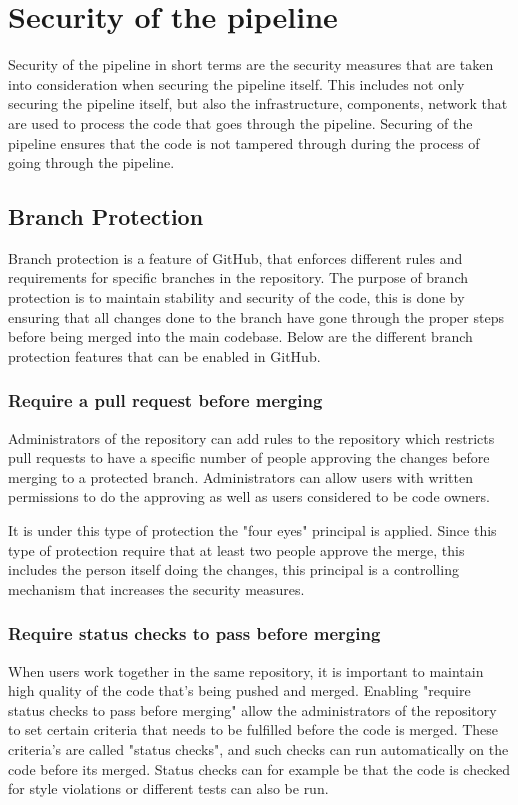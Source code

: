 \section{Security of the pipeline}
Security of the pipeline in short terms are the security measures that are taken into consideration when securing the pipeline itself. This includes not only securing the pipeline itself, but also the infrastructure, components, network that are used to process the code that goes through the pipeline. Securing of the pipeline ensures that the code is not tampered through during the process of going through the pipeline. 


\subsection{Branch Protection}
\label{branchprotection}
Branch protection is a feature of GitHub, that enforces different rules and requirements for specific branches in the repository. The purpose of branch protection is to maintain stability and security of the code, this is done by ensuring that all changes done to the branch have gone through the proper steps before being merged into the main codebase. Below are the different branch protection features that can be enabled in GitHub. \cite{ProtectedBranches}
\\
\subsubsection{Require a pull request before merging}
Administrators of the repository can add rules to the repository which restricts pull requests to have a specific number of people approving the changes before merging to a protected branch. Administrators can allow users with written permissions to do the approving as well as users considered to be code owners. 

It is under this type of protection the "four eyes" principal is applied. Since this type of protection require that at least two people approve the merge, this includes the person itself doing the changes, this principal is a controlling mechanism that increases the security measures. 
\\
\subsubsection{Require status checks to pass before merging}
When users work together in the same repository, it is important to maintain high quality of the code that's being pushed and merged. Enabling "require status checks to pass before merging" allow the administrators of the repository to set certain criteria that needs to be fulfilled before the code is merged. These criteria's are called "status checks", and such checks can run automatically on the code before its merged. Status checks can for example be that the code is checked for style violations or different tests can also be run. 
\newpage
